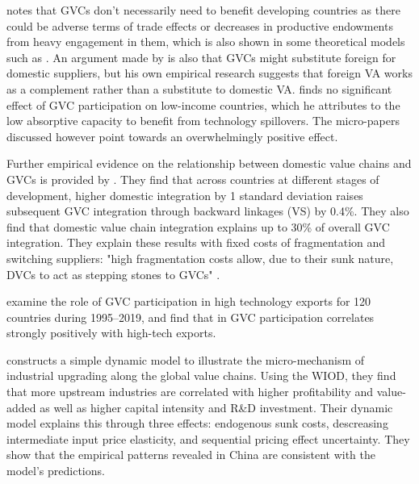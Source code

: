 \documentclass[a4paper]{article}
\begin{document}
\citet{Kummritz20161} notes that GVCs don't necessarily need to benefit developing countries as there could be adverse terms of trade effects or decreases in productive endowments from heavy engagement in them, which is also shown in some theoretical models such as \citet{baldwin2014trade}. An argument made by \citet{kummritz2015global} is also that GVCs might substitute foreign for domestic suppliers, but his own empirical research suggests that foreign VA works as a complement rather than a substitute to domestic VA. %
 \citet{kummritz2015global} finds no significant effect of GVC participation on low-income countries, which he attributes to the low absorptive capacity to benefit from technology spillovers. The micro-papers discussed however point towards an overwhelmingly positive effect. \newline

Further empirical evidence on the relationship between domestic value chains and GVCs is provided by \citet{beverelli2019domestic}. They find that across countries at different stages of development, higher domestic integration by 1 standard deviation raises subsequent GVC integration through backward linkages (VS) by 0.4\%. They also find that domestic value chain integration explains up to 30\% of overall GVC integration. They explain these results with fixed costs of fragmentation and switching suppliers: "high fragmentation costs allow, due to their sunk nature, DVCs to act as stepping stones to GVCs" \citep{beverelli2019domestic}. %


\citet{altun2023does} examine the role of GVC participation in high technology exports for 120 countries during 1995–2019, and find that in GVC participation correlates strongly positively with high-tech exports. 

\citet{shen2021towards} constructs a simple dynamic model to illustrate the micro-mechanism of industrial upgrading along the global value chains. Using the WIOD, they find that more upstream industries are correlated with higher profitability and value-added as well as higher capital intensity and R\&D investment. Their dynamic model explains this through three effects: endogenous sunk costs, descreasing intermediate input price elasticity, and sequential pricing effect uncertainty. They show that the empirical patterns revealed in China are consistent with the model's predictions. 
\end{document}
